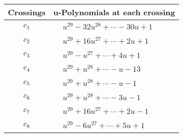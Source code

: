 \documentclass[1p]{elsarticle_modified}
\theoremstyle{definition}
\begin{document}
\begin{tabular}{m{50pt}|m{274pt}}
Crossings & \hspace{64pt}u-Polynomials at each crossing \\
\hline $$\begin{aligned}c_{1}\end{aligned}$$&$\begin{aligned}
&u^{29}-32 u^{28}+\cdots-30 u+1
\end{aligned}$\\
\hline $$\begin{aligned}c_{2}\end{aligned}$$&$\begin{aligned}
&u^{29}+16 u^{27}+\cdots+2 u+1
\end{aligned}$\\
\hline $$\begin{aligned}c_{3}\end{aligned}$$&$\begin{aligned}
&u^{29}- u^{27}+\cdots+4 u+1
\end{aligned}$\\
\hline $$\begin{aligned}c_{4}\end{aligned}$$&$\begin{aligned}
&u^{29}+u^{28}+\cdots- u-13
\end{aligned}$\\
\hline $$\begin{aligned}c_{5}\end{aligned}$$&$\begin{aligned}
&u^{29}+u^{28}+\cdots- u-1
\end{aligned}$\\
\hline $$\begin{aligned}c_{6}\end{aligned}$$&$\begin{aligned}
&u^{29}+u^{28}+\cdots-3 u-1
\end{aligned}$\\
\hline $$\begin{aligned}c_{7}\end{aligned}$$&$\begin{aligned}
&u^{29}+16 u^{27}+\cdots+2 u-1
\end{aligned}$\\
\hline $$\begin{aligned}c_{8}\end{aligned}$$&$\begin{aligned}
&u^{29}-6 u^{27}+\cdots+5 u+1
\end{aligned}$\\

\end{tabular}
\end{document}
